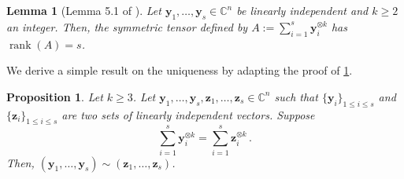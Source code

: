 \documentclass[11pt]{article}
\newtheorem{lemma}[theorem]{Lemma}
\newtheorem{proposition}[theorem]{Proposition}
\DeclareMathOperator{\rank}{rank}
\begin{document}
\begin{lemma}[Lemma 5.1 of \cite{comon_symmetric_2008}]\label{lem:linearly-independent-tensor-rank}
  Let $\mathbf{y}_1, \ldots, \mathbf{y}_s \in \mathbb{C}^n$ be linearly independent and $k \ge 2$ an integer.
  Then, the symmetric tensor defined by $A := \sum_{i = 1}^{s} \mathbf{y}_i^{\otimes k}$ has $\rank(A) = s$.
\end{lemma}
We derive a simple result on the uniqueness by adapting the proof of \cref{lem:linearly-independent-tensor-rank}.
\begin{proposition}\label{prop:uniqueness-tensor-decomposition}
  Let $k \ge 3$.
  Let $\mathbf{y}_1, \ldots, \mathbf{y}_s, \mathbf{z}_1, \ldots, \mathbf{z}_s \in \mathbb{C}^n$ such that $\{\mathbf{y}_i\}_{1 \le i \le s}$ and $\{\mathbf{z}_i\}_{1 \le i \le s}$ are two sets of linearly independent vectors.
  Suppose
  \begin{equation}\label{eq:symmetric-sum-equal}
    \sum_{i = 1}^{s} \mathbf{y}_i^{\otimes k} = \sum_{i = 1}^{s} \mathbf{z}_i^{\otimes k} \, .
  \end{equation}
  Then, $(\mathbf{y}_1, \ldots, \mathbf{y}_s) \sim (\mathbf{z}_1, \ldots, \mathbf{z}_s)$.
\end{proposition}
\end{document}
